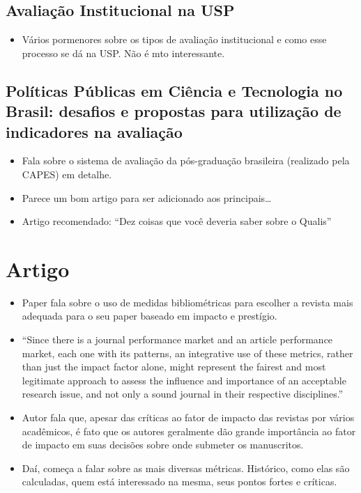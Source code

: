 \documentclass[11pt]{article}
\begin{document}
\subsection{Avaliação Institucional na USP}
\label{sec:org66ff0dd}

\begin{itemize}
\item Vários pormenores sobre os tipos de avaliação institucional e como esse processo se dá na USP. Não é mto interessante.
\end{itemize}


\subsection{Políticas Públicas em Ciência e Tecnologia no Brasil: desafios e propostas para utilização de indicadores na avaliação}
\label{sec:org4e5cdc8}

\begin{itemize}
\item Fala sobre o sistema de avaliação da pós-graduação brasileira (realizado pela CAPES) em detalhe.

\item Parece um bom artigo para ser adicionado aos principais\ldots{}

\item Artigo recomendado: ``Dez coisas que você deveria saber sobre o Qualis''
\end{itemize}

\section{Artigo \cite{roldan-valadez2019}}
\label{sec:orgd9b67e1}

\begin{itemize}
\item Paper fala sobre o uso de medidas bibliométricas para escolher a revista mais adequada para o seu paper baseado em impacto e prestígio.
\item ``Since there is a journal performance market and an article performance market, each one with its patterns, an integrative use of these metrics, rather than just the impact factor alone, might represent the fairest and most legitimate approach to assess the influence and importance of an acceptable research issue, and not only a sound journal in their respective disciplines.''
\item Autor fala que, apesar das críticas ao fator de impacto das revistas por vários acadêmicos, é fato que os autores geralmente dão grande importância ao fator de impacto em suas decisões sobre onde submeter os manuscritos.
\item Daí, começa a falar sobre as mais diversas métricas. Histórico, como elas são calculadas, quem está interessado na mesma, seus pontos fortes e críticas.
\end{itemize}
\end{document}
